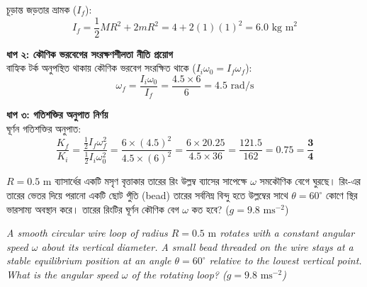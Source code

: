 \documentclass[12pt, a4paper]{article}
\begin{document}
{{\begin{tcolorbox}[solutionbox={সমাধান (Solution)}]
চূড়ান্ত জড়তার ভ্রামক ($I_f$):
\[I_f = \frac{1}{2} M R^2 + 2 m R^2 = 4 + 2(1)(1)^2 = 6.0\text{ kg m}^2\]

\vspace{0.5em}
\noindent\textbf{ধাপ ২: কৌণিক ভরবেগের সংরক্ষণশীলতা নীতি প্রয়োগ} \\
বাহ্যিক টর্ক অনুপস্থিত থাকায় কৌণিক ভরবেগ সংরক্ষিত থাকে ($I_i \omega_0 = I_f \omega_f$):
\[\omega_f = \frac{I_i \omega_0}{I_f} = \frac{4.5 \times 6}{6} = 4.5\text{ rad/s}\]

\vspace{0.5em}
\noindent\textbf{ধাপ ৩: গতিশক্তির অনুপাত নির্ণয়} \\
ঘূর্ণন গতিশক্তির অনুপাত:
\[\frac{K_f}{K_i} = \frac{\frac{1}{2} I_f \omega_f^2}{\frac{1}{2} I_i \omega_0^2} = \frac{6 \times (4.5)^2}{4.5 \times (6)^2} = \frac{6 \times 20.25}{4.5 \times 36} = \frac{121.5}{162} = 0.75 = \mathbf{\frac{3}{4}}\]
\end{tcolorbox}
\begin{tcolorbox}[questionbox={প্রশ্ন (Question) 20}]
    \noindent
    $R = 0.5\text{ m}$ ব্যাসার্ধের একটি মসৃণ বৃত্তাকার তারের রিং উল্লম্ব ব্যাসের সাপেক্ষে $\omega$ সমকৌণিক বেগে ঘুরছে। রিং-এর তারের ভেতর দিয়ে পরানো একটি ছোট পুঁতি (bead) তারের সর্বনিম্ন বিন্দু হতে উল্লম্বের সাথে $\theta = 60^\circ$ কোণে স্থির ভারসাম্য অবস্থান করে। তারের রিংটির ঘূর্ণন কৌণিক বেগ $\omega$ কত হবে? ($g = 9.8\text{ ms}^{-2}$)
    
    \vspace{0.8em}
    \begin{english}
    \noindent\textit{\color{darkgray}
    A smooth circular wire loop of radius $R = 0.5\text{ m}$ rotates with a constant angular speed $\omega$ about its vertical diameter. A small bead threaded on the wire stays at a stable equilibrium position at an angle $\theta = 60^\circ$ relative to the lowest vertical point. What is the angular speed $\omega$ of the rotating loop? ($g = 9.8\text{ ms}^{-2}$)
    }
    \end{english}
\end{tcolorbox}

\vspace{1em}
\begin{center}
\end{center}}}
\end{document}
